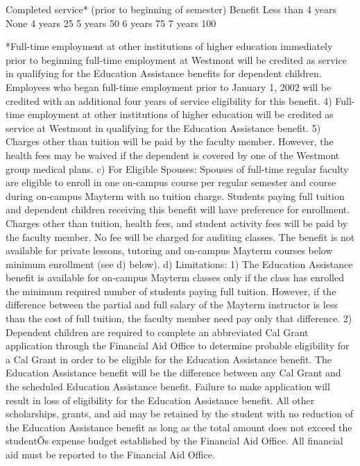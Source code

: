 \documentclass[letterpaper, 11pt]{article}
\begin{document}
				Completed service* (prior to beginning of semester)
				Benefit
				Less than 4 years
				None
				4 years
				25%
				5 years
				50%
				6 years
				75%
				7 years
				100%

				*Full-time employment at other institutions of higher education immediately prior to beginning full-time employment at Westmont will be credited as service in qualifying for the Education Assistance benefits for dependent children.  Employees who began full-time employment prior to January 1, 2002 will be credited with an additional four years of service eligibility for this benefit.
				4) Full-time employment at other institutions of higher education will be credited as service at Westmont in qualifying for the Education Assistance benefit.
				5) Charges other than tuition will be paid by the faculty member.  However, the health fees may be waived if the dependent is covered by one of the Westmont group medical plans.
				c) For Eligible Spouses:
				Spouses of full-time regular faculty are eligible to enroll in one on-campus course per regular semester and course during on-campus Mayterm with no tuition charge.  Students paying full tuition and dependent children receiving this benefit will have preference for enrollment.  Charges other than tuition, health fees, and student activity fees will be paid by the faculty member.  No fee will be charged for auditing classes.  The benefit is not available for private lessons, tutoring and on-campus Mayterm courses below minimum enrollment (see d) below).
				d) Limitations:
				1) The Education Assistance benefit is available for on-campus Mayterm classes only if the class has enrolled the minimum required number of students paying full tuition.  However, if the difference between the partial and full salary of the Mayterm instructor is less than the cost of full tuition, the faculty member need pay only that difference.
				2) Dependent children are required to complete an abbreviated Cal Grant application through the Financial Aid Office to determine probable eligibility for a Cal Grant in order to be eligible for the Education Assistance benefit.  The Education Assistance benefit will be the difference between any Cal Grant and the scheduled Education Assistance benefit.  Failure to make application will result in loss of eligibility for the Education Assistance benefit.  All other scholarships, grants, and aid may be retained by the student with no reduction of the Education Assistance benefit as long as the total amount does not exceed the studentÕs expense budget established by the Financial Aid Office.  All financial aid must be reported to the Financial Aid Office.
\end{document}
